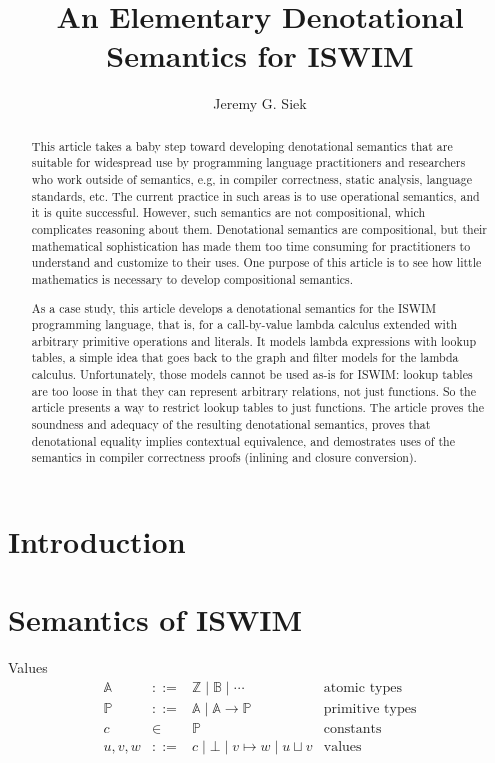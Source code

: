 \documentclass{article}
\title{An Elementary Denotational \\ Semantics for ISWIM}
\author{Jeremy G. Siek}
\begin{document}
\maketitle

\begin{abstract}
  This article takes a baby step toward developing denotational
  semantics that are suitable for widespread use by programming
  language practitioners and researchers who work outside of
  semantics, e.g, in compiler correctness, static analysis, language
  standards, etc. The current practice in such areas is to use
  operational semantics, and it is quite successful. However, such
  semantics are not compositional, which complicates reasoning about
  them.  Denotational semantics are compositional, but their
  mathematical sophistication has made them too time consuming for
  practitioners to understand and customize to their uses. One purpose
  of this article is to see how little mathematics is necessary to
  develop compositional semantics.

  As a case study, this article develops a denotational semantics for
  the ISWIM programming language, that is, for a call-by-value lambda
  calculus extended with arbitrary primitive operations and literals.
  It models lambda expressions with lookup tables, a simple idea that
  goes back to the graph and filter models for the lambda
  calculus. Unfortunately, those models cannot be used as-is for
  ISWIM: lookup tables are too loose in that they can represent
  arbitrary relations, not just functions. So the article presents a
  way to restrict lookup tables to just functions. The article proves
  the soundness and adequacy of the resulting denotational semantics,
  proves that denotational equality implies contextual equivalence,
  and demostrates uses of the semantics in compiler correctness proofs
  (inlining and closure conversion).
\end{abstract}


\section{Introduction}

\citet{Barendregt:2013aa}

\section{Semantics of ISWIM}

Values
\[
\begin{array}{lcll}
  \mathbb{A} & ::= & \mathbb{Z} \mid \mathbb{B} \mid \cdots & \text{atomic types}\\
  \mathbb{P} & ::= & \mathbb{A} \mid \mathbb{A} \to \mathbb{P} & \text{primitive types}\\
  c & \in & \mathbb{P} & \text{constants} \\
  u,v,w & ::= & c \mid \bot \mid v \mapsto w \mid u \sqcup v & \text{values}
\end{array}
\]
\end{document}
